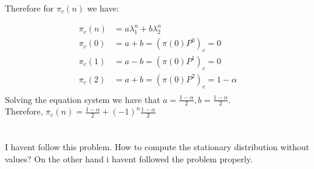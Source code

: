 \documentclass[12pt, a4paper]{article}
\begin{document}
Therefore for $\pi_c(n)$ we have:

\begin{subequations}
  \begin{align}
    \pi_c(n) &= a \lambda_1^n + b \lambda_2^n \\
    \pi_c(0) &= a + b = (\pi(0)P^0)_c = 0\\
    \pi_c(1) &= a - b = (\pi(0)P^1)_c = 0\\
    \pi_c(2) &= a + b = (\pi(0)P^2)_c = 1-\alpha\\
  \end{align}
\end{subequations}
Solving the equation system we have that $a = \frac{1-\alpha}{2}, b = \frac{1-\alpha}{2}$.\\
Therefore, $\pi_c(n) = \frac{1-\alpha}{2} + (-1)^n \frac{1-\alpha}{2}$

\section{}
I havent follow this problem. How to compute the stationary distribution without values? On the other hand i havent followed the problem properly.
 
\end{document}

